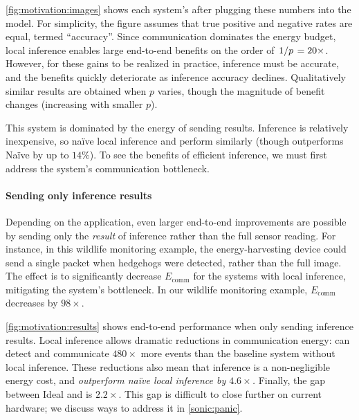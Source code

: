 \figMotivateImages

\autoref{fig:motivation:images} shows each system's \metric after
plugging these numbers into the model.
%
For simplicity, the figure assumes that true positive and negative
rates are equal, termed ``accuracy''.
%
Since communication dominates the energy budget, local inference
enables large end-to-end benefits on the order of $\left.1\middle/p\right. = 20\times$.
%
However, for these gains to be realized in practice, inference must be
accurate, and the benefits quickly deteriorate as inference accuracy
declines.
%
Qualitatively similar results are obtained when $p$ varies, though the
magnitude of benefit changes (increasing with smaller $p$).

This system is dominated by the energy of sending results.
Inference is relatively inexpensive, so na\"ive local inference and \sonictails perform similarly
(though \sonictails outperforms Na\"ive by up to $14\%$).
To see the benefits of efficient inference, we must first address the system's communication bottleneck.

\paragraph{Sending only inference results}
%
Depending on the application, even larger end-to-end improvements are
possible by sending only the \emph{result} of inference rather than
the full sensor reading.
%
For instance, in this wildlife monitoring example, the
energy-harvesting device could send a single packet when hedgehogs
were detected, rather than the full image.
%
The effect is to significantly decrease $E_\text{comm}$
for the systems with local inference, mitigating the system's
bottleneck.
%
In our wildlife monitoring example, $E_\text{comm}$ decreases by $98\times$.

\figMotivateResults

\autoref{fig:motivation:results} shows end-to-end performance when
only sending inference results.
%
Local inference allows dramatic reductions in communication energy:
\sonictails can detect and communicate $480\times$ more events than
the baseline system without local inference.
%
These reductions also mean that inference is a non-negligible
energy cost,
and \emph{\sonictails outperform na\"ive local inference by $4.6\times$.}
Finally, the gap between Ideal and \sonictails is $2.2\times$.
%
This gap is difficult to close further on current hardware;
we discuss ways to address it in \autoref{sonic:panic}.